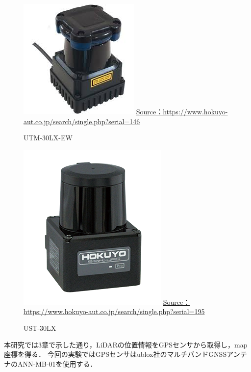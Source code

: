 \documentclass[autodetect-engine,dvipdfmx-if-dvi,ja=standard,a4j,jbase=11pt,magstyle=nomag*]{bxjsreport}
\begin{document}
\begin{figure}[b]
    \centering
    \includegraphics[width=0.6\linewidth, clip]{./figure/chapter4/lidar1.jpg}
    \url{Source：https://www.hokuyo-aut.co.jp/search/single.php?serial=146}
    \caption{UTM-30LX-EW}
    \label{fig:lidar1}
\end{figure}

\begin{figure}[b]
    \centering
    \includegraphics[width=0.6\linewidth, clip]{./figure/chapter4/lidar2.png}
    \url{Source：https://www.hokuyo-aut.co.jp/search/single.php?serial=195}
    \caption{UST-30LX}
    \label{fig:lidar2}
\end{figure}

本研究では3章で示した通り，LiDARの位置情報をGPSセンサから取得し，map座標を得る．
今回の実験ではGPSセンサはublox社のマルチバンドGNSSアンテナのANN-MB-01を使用する．
\end{document}
